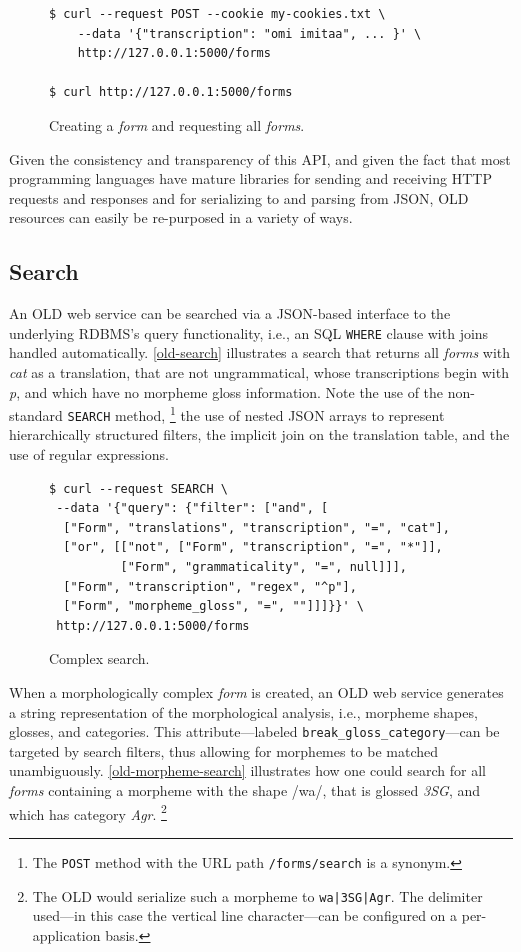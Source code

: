 \documentclass[11pt]{article}
\begin{document}
\begin{figure}[h]
\scriptsize
\begin{verbatim}
$ curl --request POST --cookie my-cookies.txt \
    --data '{"transcription": "omi imitaa", ... }' \
    http://127.0.0.1:5000/forms

$ curl http://127.0.0.1:5000/forms
\end{verbatim}
\normalsize
\caption{Creating a \emph{form} and requesting all \emph{forms}.}
\label{old-form}
\end{figure}

Given the consistency and transparency of this API, and given the fact that
most programming languages have mature libraries for sending and receiving 
HTTP requests and responses and for serializing to and parsing from JSON, OLD
resources can easily be re-purposed in a variety of ways.


\subsection{Search}

An OLD web service can be searched via a JSON-based interface to the underlying
RDBMS's query functionality, i.e., an SQL \texttt{WHERE} clause with joins
handled automatically. \autoref{old-search} illustrates a search that returns
all \emph{forms} with \textit{cat} as a translation, that are not ungrammatical, whose
transcriptions begin with \textit{p}, and which have no morpheme gloss
information. Note the use of the non-standard \texttt{SEARCH} method,%
\footnote{The \texttt{POST} method with the URL path \texttt{/forms/search} is
a synonym.} %
the use of nested JSON arrays to represent hierarchically structured filters,
the implicit join on the translation table, and the use of regular expressions.

\begin{figure}[h]
\scriptsize
\begin{verbatim}
$ curl --request SEARCH \
 --data '{"query": {"filter": ["and", [
  ["Form", "translations", "transcription", "=", "cat"],
  ["or", [["not", ["Form", "transcription", "=", "*"]],
          ["Form", "grammaticality", "=", null]]],
  ["Form", "transcription", "regex", "^p"],
  ["Form", "morpheme_gloss", "=", ""]]]}}' \
 http://127.0.0.1:5000/forms
\end{verbatim}
\normalsize
\caption{Complex search.}
\label{old-search}
\end{figure}

When a morphologically complex \emph{form} is created, an OLD web service generates
a string representation of the morphological analysis, i.e., morpheme shapes,
glosses, and categories. This attribute---labeled
\texttt{break\_gloss\_category}---can be targeted by search filters, thus allowing
for morphemes to be matched unambiguously. \autoref{old-morpheme-search}
illustrates how one could search for all \emph{forms} containing a morpheme with the
shape /wa/, that is glossed \textit{3SG}, and which has category \textit{Agr}.%
\footnote{The OLD would serialize such a morpheme to \texttt{wa|3SG|Agr}. The
delimiter used---in this case the vertical line character---can be configured on
a per-application basis.}
\end{document}
